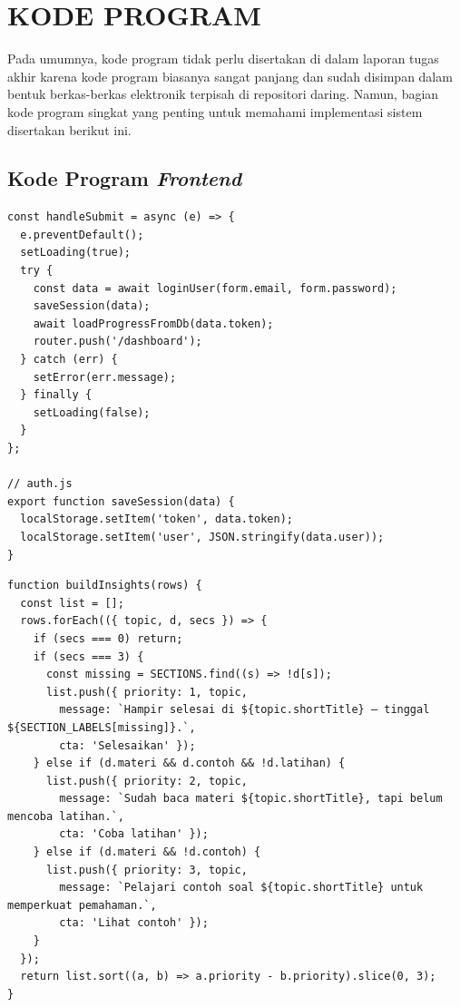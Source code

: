 \cleardoublepage
\chapter{KODE PROGRAM}
\label{chap:lampiran-a}
Pada umumnya, kode program tidak perlu disertakan di dalam laporan tugas akhir karena kode program biasanya sangat panjang dan sudah disimpan dalam bentuk berkas-berkas elektronik terpisah di repositori daring. Namun, bagian kode program singkat yang penting untuk memahami implementasi sistem disertakan berikut ini.

\section{Kode Program \textit{Frontend}}

\begin{lstlisting}[style=javascriptstyle, caption={Implementasi Alur \textit{Login} dan Penyimpanan Sesi}, label={lst:login}]
const handleSubmit = async (e) => {
  e.preventDefault();
  setLoading(true);
  try {
    const data = await loginUser(form.email, form.password);
    saveSession(data);
    await loadProgressFromDb(data.token);
    router.push('/dashboard');
  } catch (err) {
    setError(err.message);
  } finally {
    setLoading(false);
  }
};

// auth.js
export function saveSession(data) {
  localStorage.setItem('token', data.token);
  localStorage.setItem('user', JSON.stringify(data.user));
}
\end{lstlisting}

\begin{lstlisting}[style=javascriptstyle, caption={Fungsi \texttt{buildInsights} untuk Rekomendasi Topik}, label={lst:beranda-insights}]
function buildInsights(rows) {
  const list = [];
  rows.forEach(({ topic, d, secs }) => {
    if (secs === 0) return;
    if (secs === 3) {
      const missing = SECTIONS.find((s) => !d[s]);
      list.push({ priority: 1, topic,
        message: `Hampir selesai di ${topic.shortTitle} — tinggal ${SECTION_LABELS[missing]}.`,
        cta: 'Selesaikan' });
    } else if (d.materi && d.contoh && !d.latihan) {
      list.push({ priority: 2, topic,
        message: `Sudah baca materi ${topic.shortTitle}, tapi belum mencoba latihan.`,
        cta: 'Coba latihan' });
    } else if (d.materi && !d.contoh) {
      list.push({ priority: 3, topic,
        message: `Pelajari contoh soal ${topic.shortTitle} untuk memperkuat pemahaman.`,
        cta: 'Lihat contoh' });
    }
  });
  return list.sort((a, b) => a.priority - b.priority).slice(0, 3);
}
\end{lstlisting}

